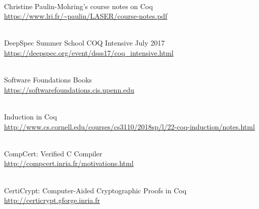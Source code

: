 \documentclass{article}
\begin{document}
~\\
Christine Paulin-Mohring's course notes on Coq 	\\
\url{https://www.lri.fr/~paulin/LASER/course-notes.pdf}

~\\
DeepSpec Summer School COQ Intensive July 2017	\\
\url{https://deepspec.org/event/dsss17/coq\_intensive.html}

~\\
Software Foundations Books		\\
\url{https://softwarefoundations.cis.upenn.edu}

~\\
Induction in Coq		\\
\url{http://www.cs.cornell.edu/courses/cs3110/2018sp/l/22-coq-induction/notes.html}

~\\
CompCert: Verified C Compiler		\\
\url{http://compcert.inria.fr/motivations.html}

~\\
CertiCrypt: Computer-Aided Cryptographic Proofs in Coq		\\
\url{http://certicrypt.gforge.inria.fr}
\end{document}

